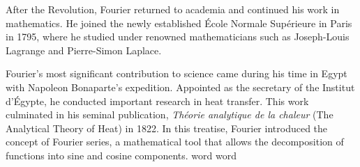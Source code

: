 \documentclass[12pt, a4paper]{book}
\begin{document}
	\bigskip
	\indent After the Revolution, Fourier returned to academia and continued his work in mathematics.
	He joined the newly established École Normale Supérieure in Paris in 1795, where he studied under
	renowned mathematicians such as Joseph-Louis Lagrange and Pierre-Simon Laplace.
	
	\bigskip
	\indent Fourier's most significant contribution to science came during his time in Egypt with
	Napoleon Bonaparte's expedition. Appointed as the secretary of the Institut d'Égypte, he conducted
	important research in heat transfer. This work culminated in his seminal publication,
	\textit{Théorie analytique de la chaleur} (The Analytical Theory of Heat) in 1822. In this
	treatise, Fourier introduced the concept of Fourier series, a mathematical tool that allows the
	decomposition of functions into sine and cosine components.
	word {\raisebox{0.15ex}{\fontsize{3}{3}\selectfont$\blacksquare$}} word
	
\end{document}
